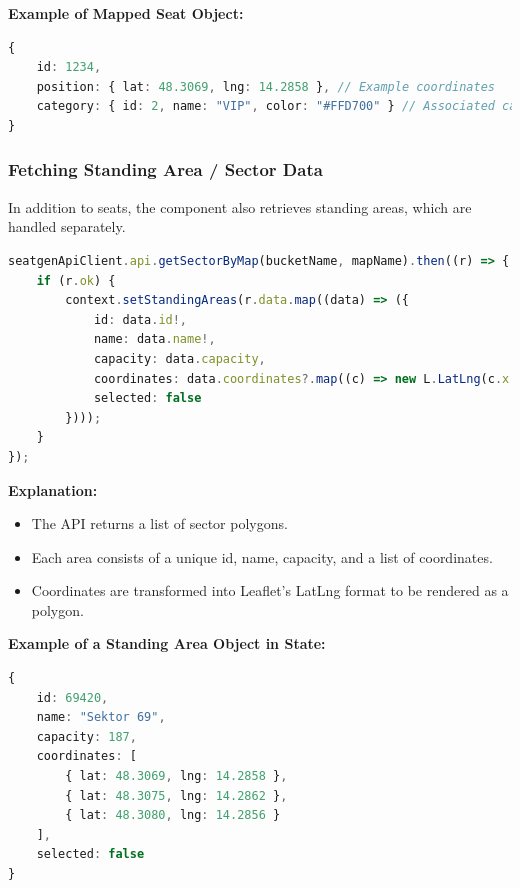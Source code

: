\textbf{Example of Mapped Seat Object:}
\begin{lstlisting}[language=TypeScript, caption=Seat Object in State, label=lst:seat-object]
{
    id: 1234,
    position: { lat: 48.3069, lng: 14.2858 }, // Example coordinates
    category: { id: 2, name: "VIP", color: "#FFD700" } // Associated category
}
\end{lstlisting}

\subsubsection{Fetching Standing Area / Sector Data}
In addition to seats, the component also retrieves standing areas, which are handled separately.

\begin{lstlisting}[language=TypeScript, caption=Fetching Standing Areas, label=lst:fetch-standingareas]
seatgenApiClient.api.getSectorByMap(bucketName, mapName).then((r) => {
    if (r.ok) {
        context.setStandingAreas(r.data.map((data) => ({
            id: data.id!,
            name: data.name!,
            capacity: data.capacity,
            coordinates: data.coordinates?.map((c) => new L.LatLng(c.x!, c.y!)) ?? [],
            selected: false
        })));
    }
});
\end{lstlisting}

\textbf{Explanation:}
\begin{itemize}
    \item The API returns a list of sector polygons.
    \item Each area consists of a unique id, name, capacity, and a list of coordinates.
    \item Coordinates are transformed into Leaflet’s LatLng format to be rendered as a polygon.
\end{itemize}

\textbf{Example of a Standing Area Object in State:}
\begin{lstlisting}[language=TypeScript, caption=Standing Area Object in State, label=lst:standingarea-object]
{
    id: 69420,
    name: "Sektor 69",
    capacity: 187,
    coordinates: [
        { lat: 48.3069, lng: 14.2858 },
        { lat: 48.3075, lng: 14.2862 },
        { lat: 48.3080, lng: 14.2856 }
    ],
    selected: false
}
\end{lstlisting}

